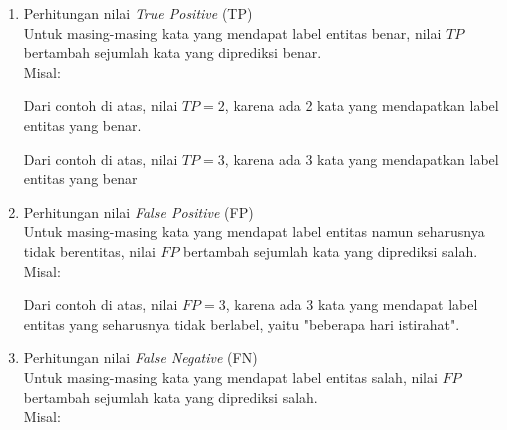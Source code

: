 	\begin{enumerate}
		\item Perhitungan nilai \textit{True Positive} (TP)\\
		Untuk masing-masing kata yang mendapat label entitas benar, nilai $ TP $ bertambah sejumlah kata yang diprediksi benar.\\
		Misal:
		
		
		Dari contoh di atas, nilai $ TP = 2 $, karena ada 2 kata yang mendapatkan label entitas yang benar.
		
	
		Dari contoh di atas, nilai $ TP = 3 $, karena ada 3 kata yang mendapatkan label entitas yang benar
		
		\item Perhitungan nilai \textit{False Positive} (FP)\\
		Untuk masing-masing kata yang mendapat label entitas namun seharusnya tidak berentitas,  nilai $ FP $ bertambah sejumlah kata yang diprediksi salah.\\
		Misal:
		
	
		Dari contoh di atas, nilai $ FP = 3 $, karena ada 3 kata yang mendapat label entitas yang seharusnya tidak berlabel, yaitu "beberapa hari istirahat".
				
		\item Perhitungan nilai \textit{False Negative} (FN)\\
		Untuk masing-masing kata yang mendapat label entitas salah,  nilai $ FP $ bertambah sejumlah kata yang diprediksi salah.\\
		Misal:
		

\end{enumerate}
